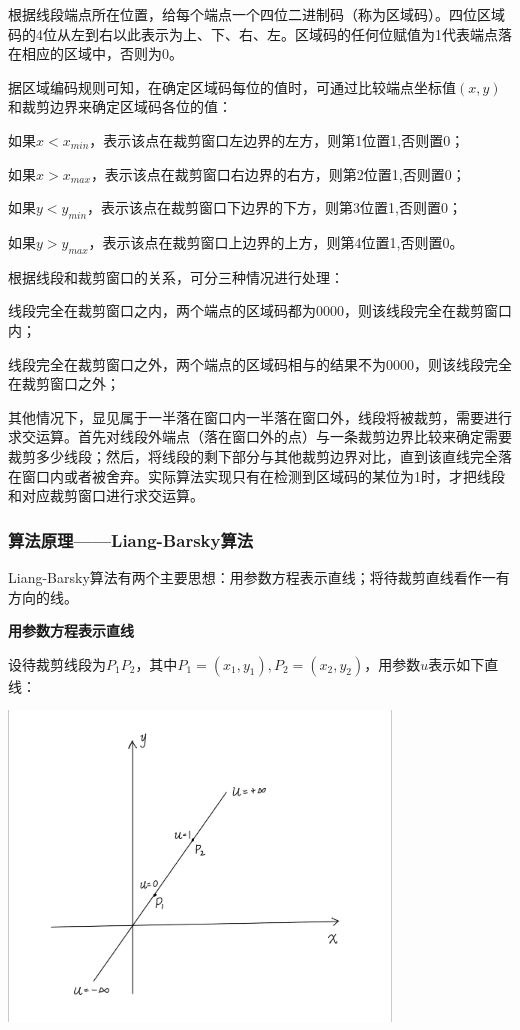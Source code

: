 \documentclass[a4paper,UTF8]{article}
\theoremstyle{definition}
\begin{document}
根据线段端点所在位置，给每个端点一个四位二进制码（称为区域码）。四位区域码的4位从左到右以此表示为上、下、右、左。区域码的任何位赋值为1代表端点落在相应的区域中，否则为0。

据区域编码规则可知，在确定区域码每位的值时，可通过比较端点坐标值$(x,y)$和裁剪边界来确定区域码各位的值：

如果$x<x_{min}$，表示该点在裁剪窗口左边界的左方，则第1位置1,否则置0；

如果$x>x_{max}$，表示该点在裁剪窗口右边界的右方，则第2位置1,否则置0；

如果$y<y_{min}$，表示该点在裁剪窗口下边界的下方，则第3位置1,否则置0；

如果$y>y_{max}$，表示该点在裁剪窗口上边界的上方，则第4位置1,否则置0。

根据线段和裁剪窗口的关系，可分三种情况进行处理：

线段完全在裁剪窗口之内，两个端点的区域码都为0000，则该线段完全在裁剪窗口内；

线段完全在裁剪窗口之外，两个端点的区域码相与的结果不为0000，则该线段完全在裁剪窗口之外；

其他情况下，显见属于一半落在窗口内一半落在窗口外，线段将被裁剪，需要进行求交运算。首先对线段外端点（落在窗口外的点）与一条裁剪边界比较来确定需要裁剪多少线段；然后，将线段的剩下部分与其他裁剪边界对比，直到该直线完全落在窗口内或者被舍弃。实际算法实现只有在检测到区域码的某位为1时，才把线段和对应裁剪窗口进行求交运算。

\subsubsection{算法原理——Liang-Barsky算法}

Liang-Barsky算法有两个主要思想：用参数方程表示直线；将待裁剪直线看作一有方向的线。

\textbf{用参数方程表示直线}

设待裁剪线段为$P_1P_2$，其中$P_1=(x_1,y_1),P_2=(x_2,y_2)$，用参数$u$表示如下直线：

\begin{center}
	\includegraphics[width=4in]{figs/2.png}
\end{center}
\end{document}
